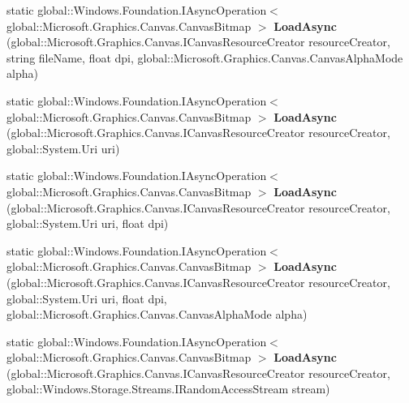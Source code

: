 \begin{DoxyCompactItemize}
\item 
\mbox{\label{class_microsoft_1_1_graphics_1_1_canvas_1_1_canvas_bitmap_afef79684594ac3ba07cf8cf01939165c}} 
static global\+::\+Windows.\+Foundation.\+I\+Async\+Operation$<$ global\+::\+Microsoft.\+Graphics.\+Canvas.\+Canvas\+Bitmap $>$ {\bfseries Load\+Async} (global\+::\+Microsoft.\+Graphics.\+Canvas.\+I\+Canvas\+Resource\+Creator resource\+Creator, string file\+Name, float dpi, global\+::\+Microsoft.\+Graphics.\+Canvas.\+Canvas\+Alpha\+Mode alpha)
\item 
\mbox{\label{class_microsoft_1_1_graphics_1_1_canvas_1_1_canvas_bitmap_a29af06676a85a4ad0adfc9e766d96ae1}} 
static global\+::\+Windows.\+Foundation.\+I\+Async\+Operation$<$ global\+::\+Microsoft.\+Graphics.\+Canvas.\+Canvas\+Bitmap $>$ {\bfseries Load\+Async} (global\+::\+Microsoft.\+Graphics.\+Canvas.\+I\+Canvas\+Resource\+Creator resource\+Creator, global\+::\+System.\+Uri uri)
\item 
\mbox{\label{class_microsoft_1_1_graphics_1_1_canvas_1_1_canvas_bitmap_a18f1f34916c8b70dc7ff8d8044e0ba43}} 
static global\+::\+Windows.\+Foundation.\+I\+Async\+Operation$<$ global\+::\+Microsoft.\+Graphics.\+Canvas.\+Canvas\+Bitmap $>$ {\bfseries Load\+Async} (global\+::\+Microsoft.\+Graphics.\+Canvas.\+I\+Canvas\+Resource\+Creator resource\+Creator, global\+::\+System.\+Uri uri, float dpi)
\item 
\mbox{\label{class_microsoft_1_1_graphics_1_1_canvas_1_1_canvas_bitmap_aeebce5625f77585197137344e96fb39d}} 
static global\+::\+Windows.\+Foundation.\+I\+Async\+Operation$<$ global\+::\+Microsoft.\+Graphics.\+Canvas.\+Canvas\+Bitmap $>$ {\bfseries Load\+Async} (global\+::\+Microsoft.\+Graphics.\+Canvas.\+I\+Canvas\+Resource\+Creator resource\+Creator, global\+::\+System.\+Uri uri, float dpi, global\+::\+Microsoft.\+Graphics.\+Canvas.\+Canvas\+Alpha\+Mode alpha)
\item 
\mbox{\label{class_microsoft_1_1_graphics_1_1_canvas_1_1_canvas_bitmap_af12c77561765c9cbef9957e4bb137793}} 
static global\+::\+Windows.\+Foundation.\+I\+Async\+Operation$<$ global\+::\+Microsoft.\+Graphics.\+Canvas.\+Canvas\+Bitmap $>$ {\bfseries Load\+Async} (global\+::\+Microsoft.\+Graphics.\+Canvas.\+I\+Canvas\+Resource\+Creator resource\+Creator, global\+::\+Windows.\+Storage.\+Streams.\+I\+Random\+Access\+Stream stream)

\end{DoxyCompactItemize}

